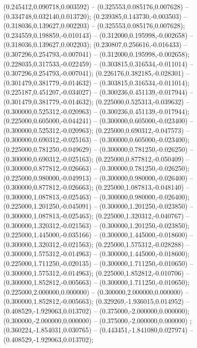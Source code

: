  (0.245412,0.090718,0.003592) -- (0.325553,0.085176,0.007628) -- (0.334748,0.032140,0.013720);
 (0.239385,0.143730,-0.003503) -- (0.318036,0.139627,0.002203) -- (0.325553,0.085176,0.007628);
 (0.234559,0.198859,-0.010143) -- (0.312000,0.195998,-0.002658) -- (0.318036,0.139627,0.002203);
 (0.230807,0.256616,-0.016433) -- (0.307296,0.254793,-0.007041) -- (0.312000,0.195998,-0.002658);
 (0.228035,0.317533,-0.022459) -- (0.303815,0.316534,-0.011014) -- (0.307296,0.254793,-0.007041);
 (0.226176,0.382185,-0.028301) -- (0.301479,0.381779,-0.014632) -- (0.303815,0.316534,-0.011014);
 (0.225187,0.451207,-0.034027) -- (0.300236,0.451139,-0.017944) -- (0.301479,0.381779,-0.014632);
 (0.225000,0.525313,-0.039632) -- (0.300000,0.525312,-0.020963) -- (0.300236,0.451139,-0.017944);
 (0.225000,0.605000,-0.044241) -- (0.300000,0.605000,-0.023400) -- (0.300000,0.525312,-0.020963);
 (0.225000,0.690312,-0.047573) -- (0.300000,0.690312,-0.025163) -- (0.300000,0.605000,-0.023400);
 (0.225000,0.781250,-0.049629) -- (0.300000,0.781250,-0.026250) -- (0.300000,0.690312,-0.025163);
 (0.225000,0.877812,-0.050409) -- (0.300000,0.877812,-0.026663) -- (0.300000,0.781250,-0.026250);
 (0.225000,0.980000,-0.049913) -- (0.300000,0.980000,-0.026400) -- (0.300000,0.877812,-0.026663);
 (0.225000,1.087813,-0.048140) -- (0.300000,1.087813,-0.025463) -- (0.300000,0.980000,-0.026400);
 (0.225000,1.201250,-0.045091) -- (0.300000,1.201250,-0.023850) -- (0.300000,1.087813,-0.025463);
 (0.225000,1.320312,-0.040767) -- (0.300000,1.320312,-0.021563) -- (0.300000,1.201250,-0.023850);
 (0.225000,1.445000,-0.035166) -- (0.300000,1.445000,-0.018600) -- (0.300000,1.320312,-0.021563);
 (0.225000,1.575312,-0.028288) -- (0.300000,1.575312,-0.014963) -- (0.300000,1.445000,-0.018600);
 (0.225000,1.711250,-0.020135) -- (0.300000,1.711250,-0.010650) -- (0.300000,1.575312,-0.014963);
 (0.225000,1.852812,-0.010706) -- (0.300000,1.852812,-0.005663) -- (0.300000,1.711250,-0.010650);
 (0.225000,2.000000,0.000000) -- (0.300000,2.000000,0.000000) -- (0.300000,1.852812,-0.005663);
 (0.329269,-1.936015,0.014952) -- (0.408529,-1.929063,0.013702) -- (0.375000,-2.000000,0.000000);
 (0.300000,-2.000000,0.000000) -- (0.375000,-2.000000,0.000000) ;
 (0.360224,-1.854031,0.030765) -- (0.443451,-1.841080,0.027974) -- (0.408529,-1.929063,0.013702);
